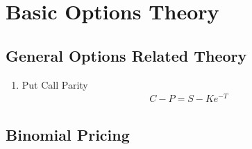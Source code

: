 \documentclass[12pt,twoside]{article}
\begin{document}
\newpage

\section{Basic Options Theory}
\subsection{General Options Related Theory}
\begin{enumerate}

	\item Put Call Parity 
		\begin{align*}
			C - P = S - Ke^{-T }
		\end{align*}
	
	\end{enumerate}
	
\subsection{Binomial Pricing}
\end{document}
